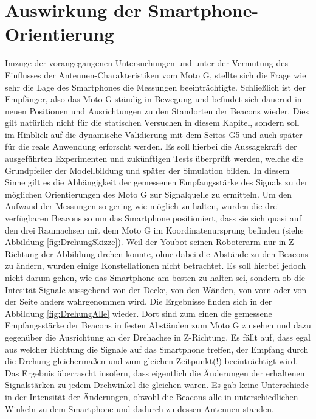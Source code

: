 \section{Auswirkung der Smartphone-Orientierung}
Imzuge der vorangegangenen Untersuchungen und unter der Vermutung des Einflusses der Antennen-Charakteristiken vom Moto G, stellte sich die Frage wie sehr die Lage des Smartphones die Messungen beeinträchtigte. Schließlich ist der Empfänger, also das Moto G ständig in Bewegung und befindet sich dauernd in neuen Positionen und Ausrichtungen zu den Standorten der Beacons wieder. Dies gilt natürlich nicht für die statischen Versuchen in diesem Kapitel, sondern soll im Hinblick auf die dynamische Validierung mit dem Scitos G5 und auch später für die reale Anwendung erforscht werden. Es soll hierbei die Aussagekraft der ausgeführten Experimenten und zukünftigen Tests überprüft werden, welche die Grundpfeiler der Modellbildung und später der Simulation bilden. In diesem Sinne gilt es die Abhängigkeit der gemessenen Empfangsstärke des Signals zu der möglichen Orientierungen des Moto G zur Signalquelle zu ermitteln. Um den Aufwand der Messungen so gering wie möglich zu halten, wurden die drei verfügbaren Beacons so um das Smartphone positioniert, dass sie sich quasi auf den drei Raumachsen mit dem Moto G im Koordinatenursprung befinden (siehe Abbildung \ref{fig:DrehungSkizze}). Weil der Youbot seinen Roboterarm nur in Z-Richtung der Abbildung drehen konnte, ohne dabei die Abstände zu den Beacons zu ändern, wurden einige Konstellationen nicht betrachtet. Es soll hierbei jedoch nicht darum gehen, wie das Smartphone am besten zu halten sei, sondern ob die Intesität Signale aussgehend von der Decke, von den Wänden, von vorn oder von der Seite anders wahrgenommen wird. Die Ergebnisse finden sich in der Abbildung \ref{fig:DrehungAlle} wieder. Dort sind zum einen die gemessene Empfangsstärke der Beacons in festen Abständen zum Moto G zu sehen und dazu gegenüber die Ausrichtung an der Drehachse in Z-Richtung. Es fällt auf, dass egal aus welcher Richtung die Signale auf das Smartphone treffen, der Empfang durch die Drehung gleichermaßen und zum gleichen Zeitpunkt(!) beeinträchtigt wird. Das Ergebnis überrascht insofern, dass eigentlich die Änderungen der erhaltenen Signalstärken zu jedem Drehwinkel die gleichen waren. Es gab keine Unterschiede in der Intensität der Änderungen, obwohl die Beacons alle in unterschiedlichen Winkeln zu dem Smartphone und dadurch zu dessen Antennen standen. 
